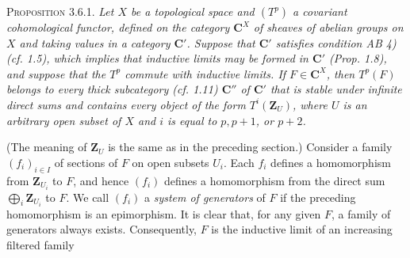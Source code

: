 \indent\textsc{Proposition 3.6.1.} \textit{Let $X$ be a topological
space and $(T^p)$ a covariant cohomological functor, defined on the category
$\mathbf C^X$ of sheaves of abelian groups on $X$ and taking values in a category
$\mathbf C'$. Suppose that $\mathbf C'$ satisfies condition \textup{AB 4)} \textup{(}cf. \textup{1.5)}, which implies
that inductive limits may be formed in $\mathbf C'$ \textup{(}Prop. \textup{1.8)}, and suppose that the
$T^p$ commute with inductive limits. If $F\in \mathbf C^X$, then $T^p(F)$ belongs to
every thick subcategory \textup{(}cf. \textup{1.11)} $\mathbf C''$ of $\mathbf C'$ that is stable under infinite
direct sums and contains every object of the form $T^i(\mathbf Z_U)$, where $U$ is an
arbitrary open subset of $X$ and $i$ is equal to $p,p+1$, or $p+2$.}

(The meaning of $\mathbf Z_U$ is the same as in the preceding section.)
Consider a family $(f_i)_{i\in I}$ of sections of $F$ on open subsets $U_i$.
Each $f_i$ defines a homomorphism from $\mathbf Z_{U_i}$ to $F$, and hence $(f_i)$
defines a homomorphism from the
direct sum $\displaystyle\bigoplus_i \mathbf Z_{U_i}$ to $F$.
We call $(f_i)$ a \textit{system of generators} of $F$ if the preceding
homomorphism is an epimorphism. It is clear that, for any given $F$, a family
of generators always exists. Consequently, $F$ is the inductive limit of an
increasing filtered family

